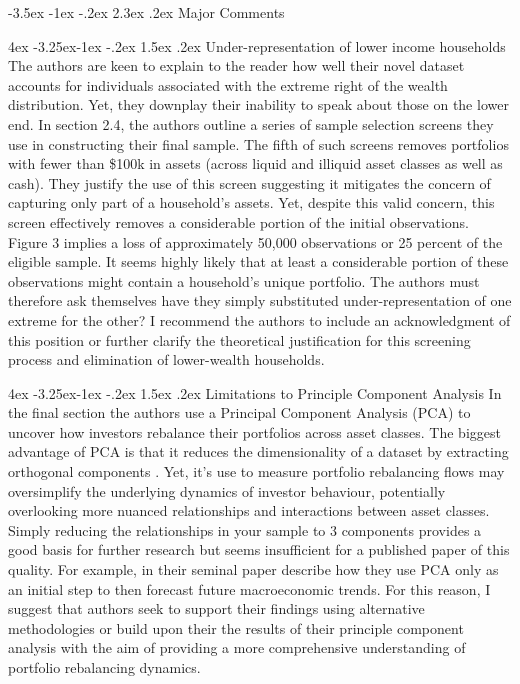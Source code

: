 \documentclass[]{article}
\makeatletter
\newcommand{\bb}{\bigbreak\noindent}
\renewcommand\section{\leftskip 0pt\@startsection {section}{1}{\z@}%
	{-3.5ex \@plus -1ex \@minus -.2ex}%
	{2.3ex \@plus.2ex}%
	{\normalfont\Large\bfseries}}
\renewcommand\subsection{\leftskip 4ex\@startsection{subsection}{2}{\z@}%
	{-3.25ex\@plus -1ex \@minus -.2ex}%
	{1.5ex \@plus .2ex}%
	{\normalfont\large\bfseries}}
\makeatother
\begin{document}
\begin{spacing}{1.25}
\section{Major Comments}


\subsection{Under-representation of lower income households}
The authors are keen to explain to the reader how well their novel dataset accounts for individuals associated with the extreme right of the wealth distribution. Yet, they downplay their inability to speak about those on the lower end. 
In section 2.4, the authors outline a series of sample selection screens they use in constructing their final sample. The fifth of such screens removes portfolios with fewer than \$100k in assets (across liquid and illiquid asset classes as well as cash). They justify the use of this screen suggesting it mitigates the concern of capturing only part of a household's assets. Yet, despite this valid concern, this screen effectively removes a considerable portion of the initial observations. Figure 3 implies a loss of approximately 50,000 observations or 25 percent of the eligible sample. It seems highly likely that at least a considerable portion of these observations might contain a household's  unique portfolio. 
\bb
 The authors must therefore ask themselves have they simply substituted under-representation of one extreme for the other? I recommend the authors to include an acknowledgment of this position or further clarify the theoretical justification for this screening process and elimination of lower-wealth households. 
	
	
	\subsection{Limitations to Principle Component Analysis}
	In the final section the authors use a Principal Component Analysis (PCA) to uncover how investors rebalance their portfolios across asset classes. The biggest advantage of PCA is that it reduces the dimensionality of a dataset by extracting orthogonal components \parencite{tsoulfidis2022new}. Yet, it's use to measure portfolio rebalancing flows may oversimplify the underlying dynamics of investor behaviour, potentially overlooking more nuanced relationships and interactions between asset classes. Simply reducing the relationships in your sample to 3 components provides a good basis for further research but seems insufficient for a published paper of this quality. For example, in their seminal paper \cite{stock2002forecasting} describe how they use PCA only as an initial step to then forecast future macroeconomic trends. For this reason, I suggest that authors seek to support their findings using alternative methodologies or build upon their the results of their principle component analysis with the aim of providing a more comprehensive understanding of portfolio rebalancing dynamics.
	

\end{spacing}
\end{document}

